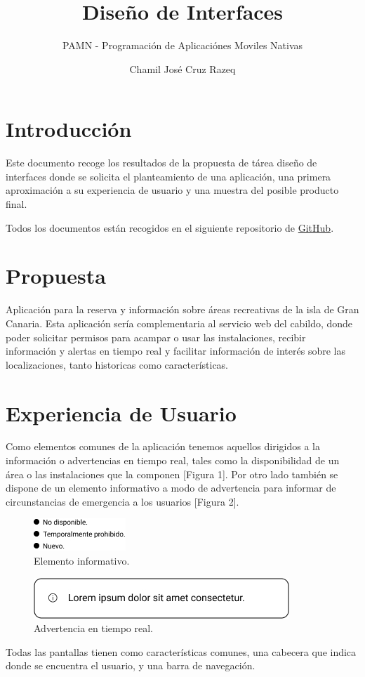 \documentclass{scrartcl}
\title{Diseño de Interfaces}
\subtitle{\large PAMN - Programación de Aplicaciónes Moviles Nativas}
\author{Chamil José Cruz Razeq}
\begin{document}
    \maketitle
    \thispagestyle{empty}
    \newpage
    \tableofcontents
    \newpage

    \section{Introducción}
        Este documento recoge los resultados de la propuesta de tárea diseño de
        interfaces donde se solicita el planteamiento de una aplicación, una 
        primera aproximación a su experiencia de usuario y una muestra del
        posible producto final.

        Todos los documentos están recogidos en el siguiente
        repositorio de \href{https://github.com/chamilstudy/ulpgc_pamn_labs}{GitHub}.
    
    \section{Propuesta}
        Aplicación para la reserva y información sobre áreas recreativas de la
        isla de Gran Canaria. Esta aplicación sería complementaria al servicio
        web del cabildo, donde poder solicitar permisos para acampar o usar las
        instalaciones, recibir información y alertas en tiempo real y facilitar
        información de interés sobre las localizaciones, tanto historicas como
        características.
    \newpage
    \section{Experiencia de Usuario}
        Como elementos comunes de la aplicación tenemos aquellos dirigidos a la
        información o advertencias en tiempo real, tales como la disponibilidad
        de un área o las instalaciones que la componen [Figura 1]. Por otro lado también se
        dispone de un elemento informativo a modo de advertencia para informar
        de circunstancias de emergencia a los usuarios [Figura 2].
        \begin{figure}[H]
            \centerline{\includegraphics[scale=0.20]{wirestate}}
            \caption{Elemento informativo.}
            \label{fig:wirestate}
        \end{figure}
        \begin{figure}[H]
            \centerline{\includegraphics[scale=0.20]{wiredanger}}
            \caption{Advertencia en tiempo real.}
            \label{fig:wiredanger}
        \end{figure}
        Todas las pantallas tienen como características comunes, una cabecera que
        indica donde se encuentra el usuario, y una barra de navegación.
        
\end{document}
